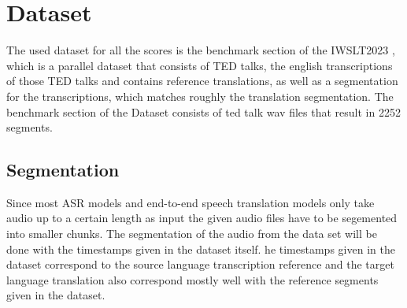 \section{Dataset}
\label{ch:Dataset}
The used dataset for all the scores is the benchmark section of the IWSLT2023 \cite{sperber2024evaluating}, which is a parallel dataset that consists of TED talks, the english transcriptions of those TED talks and contains reference translations, as well as a segmentation for the transcriptions, which matches roughly the translation segmentation. 
The benchmark section of the Dataset consists of  ted talk wav files that result in 2252 segments. 
\subsection{Segmentation}
\label{sec:FirstContent:Segmentation}
Since most ASR models and end-to-end speech translation models only take audio up to a certain length as input the given audio files have to be segemented into smaller chunks. 
The segmentation of the audio from the data set will be done with the timestamps given in the dataset itself. 
he timestamps given in the dataset correspond to the source language transcription reference and the target language translation also correspond mostly well with the reference segments given in the dataset. 
